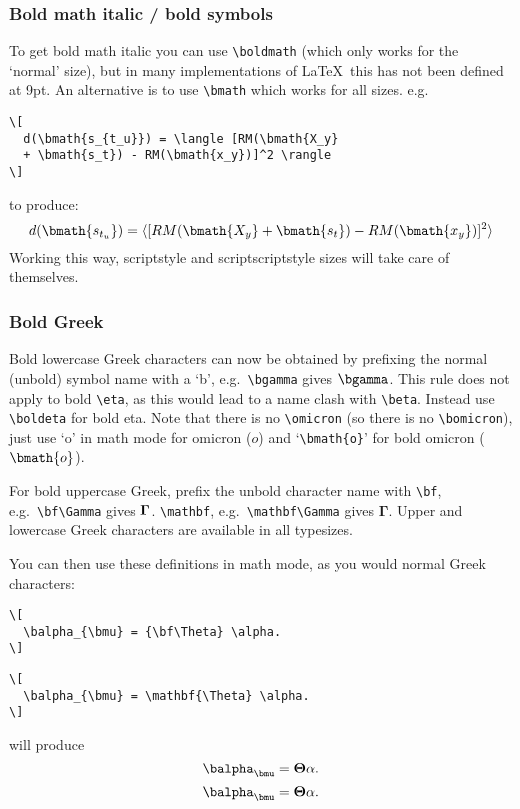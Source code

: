 \subsubsection{Bold math italic / bold symbols}

To get bold math italic you can use \verb"\boldmath" (which only works for
the `normal' size), but in many implementations of \LaTeX\ this has not
been defined at 9pt. An alternative is to use \verb"\bmath" which works
for all sizes. e.g.
%
\begin{verbatim}
\[
  d(\bmath{s_{t_u}}) = \langle [RM(\bmath{X_y}
  + \bmath{s_t}) - RM(\bmath{x_y})]^2 \rangle
\]
\end{verbatim}
%
to produce:
\[
  d(\bmath{s_{t_u}}) = \langle [RM(\bmath{X_y}
  + \bmath{s_t}) - RM(\bmath{x_y})]^2 \rangle
\]
Working this way, scriptstyle and scriptscriptstyle sizes will take care of themselves.

\subsubsection{Bold Greek}\label{boldgreek}

Bold lowercase Greek characters can now be obtained by prefixing
the normal (unbold) symbol name with a `b', e.g.\ \verb"\bgamma" gives
$\bgamma$. This rule does not apply to bold \verb"\eta", as this would lead
to a name clash with \verb"\beta". Instead use \verb"\boldeta" for bold eta.
Note that there is no \verb"\omicron" (so there is no \verb"\bomicron"),
just use `o' in math mode for omicron ($o$) and `\verb"\bmath{o}"' for bold omicron ($\bmath{o}$).

For bold uppercase Greek, prefix the unbold character name with
\ifoldfss
%
\verb"\bf", e.g.\ \verb"\bf\Gamma" gives $\bf\Gamma$.
%
\else
%
\verb"\mathbf", e.g.\ \verb"\mathbf\Gamma" gives $\mathbf\Gamma$.
%
\fi
Upper and lowercase Greek characters are available in all typesizes.

You can then use these definitions in math mode, as you would normal Greek
characters:
%
\ifoldfss
%
\begin{verbatim}
\[
  \balpha_{\bmu} = {\bf\Theta} \alpha.
\]
\end{verbatim}
%
\else
%
\begin{verbatim}
\[
  \balpha_{\bmu} = \mathbf{\Theta} \alpha.
\]
\end{verbatim}
%
\fi
%
will produce
%
\ifoldfss
%
\[
  \balpha_{\bmu} = {\bf\Theta} \alpha.
\]
%
\else
%
\[
  \balpha_{\bmu} = \mathbf{\Theta} \alpha.
\]
%
\fi

